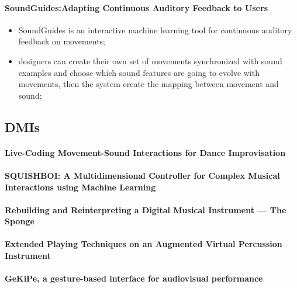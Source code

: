 \documentclass[11pt]{article}
\begin{document}
\paragraph{SoundGuides:Adapting Continuous Auditory Feedback to Users} \citep{francoise_soundguides_2016} 
\begin{itemize}
    \item SoundGuides is an interactive machine learning tool for continuous auditory feedback on movements;
    \item designers can create their own set of movements synchronized with sound examples and choose which sound features are going to evolve with movements, then the system create the mapping between movement and sound;
\end{itemize}


\subsection{DMIs}

\paragraph{Live-Coding Movement-Sound Interactions for Dance Improvisation} \citep{francoise_live-coding_2020}

\paragraph{SQUISHBOI: A Multidimensional Controller for Complex Musical Interactions using Machine Learning} \citep{desmith_squishboi_2020}

\paragraph{Rebuilding and Reinterpreting a Digital Musical Instrument — The Sponge} \citep{tom_rebuilding_2019}

\paragraph{Extended Playing Techniques on an Augmented Virtual Percussion Instrument} \citep{zappi_extended_2018} 

\paragraph{GeKiPe, a gesture-based interface for audiovisual performance} \citep{fernandez_gekipe_2017} 
\end{document}
